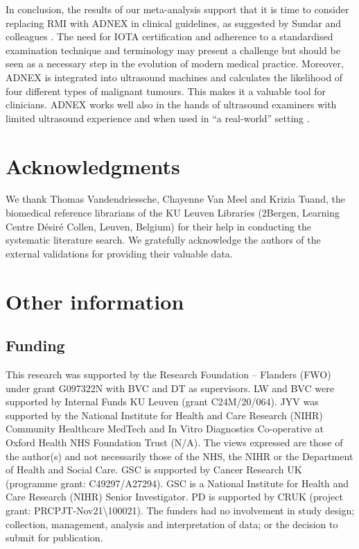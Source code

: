 In conclusion, the results of our meta-analysis support that it is time to consider
replacing \gls{RMI} with \gls{ADNEX} in clinical guidelines, as suggested by Sundar and
colleagues \cite{sundarRiskpredictionModelsPostmenopausal2024}. The need for \gls{IOTA}
certification and adherence to a standardised examination technique and terminology
may present a challenge but should be seen as a necessary step in the evolution of
modern medical practice. Moreover, \gls{ADNEX} is integrated into ultrasound machines and
calculates the likelihood of four different types of malignant tumours. This makes it
a valuable tool for clinicians. \gls{ADNEX} works well also in the hands of ultrasound
examiners with limited ultrasound experience and when used in ``a real-world''
setting
 \cite{sundarRiskpredictionModelsPostmenopausal2024,moroExternalValidationUltrasoundbased2025}.

\section*{Acknowledgments}
We thank Thomas Vandendriessche, Chayenne Van Meel and Krizia Tuand, the biomedical
reference librarians of the KU Leuven Libraries (2Bergen, Learning Centre Désiré Collen, Leuven, Belgium) for their help in conducting the systematic literature
search. We gratefully acknowledge the authors of the external validations for
providing their valuable data.

\section*{Other information}
\subsection*{Funding}
This research was supported by the Research Foundation -- Flanders (FWO) under grant
G097322N with BVC and DT as supervisors. LW and BVC were supported by Internal Funds
KU Leuven (grant C24M/20/064). JYV was supported by the National Institute for
Health and Care Research (NIHR) Community Healthcare MedTech and In Vitro Diagnostics
Co-operative at Oxford Health NHS Foundation Trust (N/A). The views expressed are
those of the author(s) and not necessarily those of the NHS, the NIHR or the
Department of Health and Social Care. GSC is supported by Cancer Research UK
(programme grant: C49297/A27294). GSC is a National Institute for Health and Care
Research (NIHR) Senior Investigator. PD is supported by CRUK (project grant:
PRCPJT-Nov21\textbackslash100021). The funders had no involvement in study design;
collection, management, analysis and interpretation of data; or the decision to
submit for publication.

